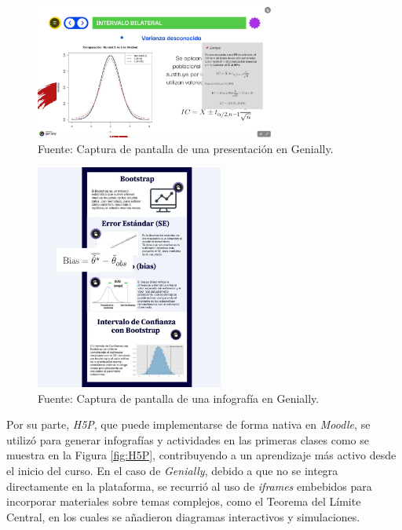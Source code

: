 \documentclass[letter,oneside,12pt,spanish]{report}
\begin{document}
\begin{figure}[ht]
	\centering
	\includegraphics[width=0.7\textwidth]{Figs/Presentacion_Genially.pdf}
	\label{fig:Pgenially}
	\\Fuente: Captura de pantalla de una presentación en Genially.
\end{figure}

\begin{figure}[ht]
	\centering
	\includegraphics[width=0.55\textwidth]{Figs/Infografia_Genially.pdf}
	\label{fig:Igenially}
	\\Fuente: Captura de pantalla de una infografía en Genially.
\end{figure}

Por su parte, \textit{H5P}, que puede implementarse de forma nativa en \textit{Moodle}, se utilizó para generar infografías y actividades en las primeras clases como se muestra en la Figura \ref{fig:H5P}, contribuyendo a un aprendizaje más activo desde el inicio del curso. En el caso de \textit{Genially}, debido a que no se integra directamente en la plataforma, se recurrió al uso de \textit{iframes} embebidos para incorporar materiales sobre temas complejos, como el Teorema del Límite Central, en los cuales se añadieron diagramas interactivos y simulaciones.
\end{document}
